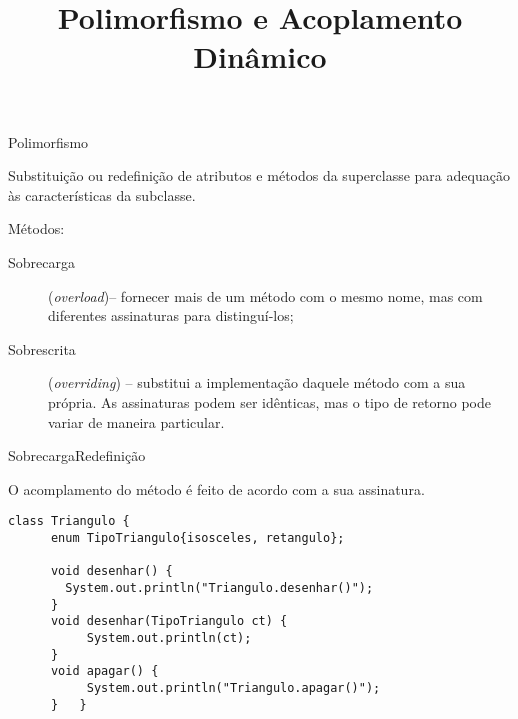 
\title{Polimorfismo e Acoplamento Dinâmico}

\frame{\maketitle}

\begin{frame}{Polimorfismo}

  Substituição ou redefinição de atributos e métodos da superclasse
  para adequação às características da subclasse.  

Métodos: 
\begin{description}
\item[Sobrecarga] ({\it overload})-- fornecer mais de um método com o
  mesmo nome, mas com diferentes assinaturas para distinguí-los;

\item[Sobrescrita] ({\it overriding}) -- substitui a implementação
  daquele método com a sua própria. As assinaturas podem ser
  idênticas, mas o tipo de retorno pode variar de maneira particular.

\end{description}

\end{frame}

\begin{frame}[fragile]{Sobrecarga}{Redefinição}
  \footnotesize

  O acomplamento do método é feito de acordo com a sua \alert{assinatura}.

\begin{center}
\end{center}

 \begin{lstlisting}[]
class Triangulo {
      enum TipoTriangulo{isosceles, retangulo}; 

      void desenhar() { 
        System.out.println("Triangulo.desenhar()");
      }
      void desenhar(TipoTriangulo ct) {
      	   System.out.println(ct);
      }
      void apagar() { 
      	   System.out.println("Triangulo.apagar()");
      }   }
  \end{lstlisting}

\end{frame}


